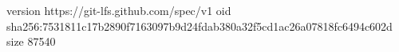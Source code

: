 version https://git-lfs.github.com/spec/v1
oid sha256:7531811c17b2890f7163097b9d24fdab380a32f5cd1ac26a07818fc6494c602d
size 87540
